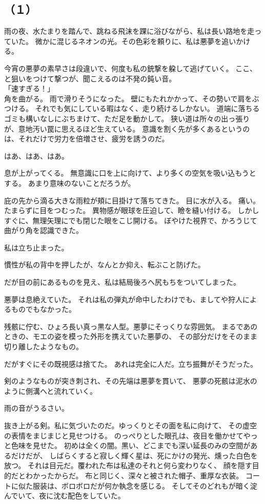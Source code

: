 \documentclass[../IHMain]{subfiles}
\begin{document}
\subsection*{（１）}
雨の夜、水たまりを踏んで、跳ねる飛沫を踝に浴びながら、私は長い路地を走っていた。
微かに混じるネオンの光。その色彩を頼りに、私は悪夢を追いかける。

今宵の悪夢の素早さは段違いで、何度も私の銃撃を躱して逃げていく。
ここ、と狙いをつけて撃つが、聞こえるのは不発の鈍い音。\\
「速すぎる！」\\
角を曲がる。
雨で滑りそうになった。
壁にもたれかかって、その勢いで肩をぶつける。
それでも気にしている暇はなく、走り続けるしかない。
道端に落ちるゴミも構いなしにぶちまけて、ただ足を動かして。
狭い道は所々の出っ張りが、意地汚い罠に思えるほど生えている。
意識を割く先が多くあるというのは、それだけで労力を倍増させ、疲労を誘うのだ。

はあ、はあ、はあ。

息が上がってくる。
無意識に口を上に向けて、より多くの空気を吸い込もうとする。
あまり意味のないことだろうが。

庇の先から滴る大きな雨粒が頬に目掛けて落ちてきた。
目に水が入る。
痛い。
たまらずに目をつむった。
異物感が眼球を圧迫して、瞼を縫い付ける。
しかしすぐに、無理矢理にでも閉じた眼をこじ開ける。
ぼやけた視界で、かろうじて曲がり角を認識できた。

私は立ち止まった。

慣性が私の背中を押したが、なんとか抑え、転ぶこと防げた。

だが目の前にあるものを見え、私は結局後ろへ尻もちをついてしまった。

悪夢は息絶えていた。
それは私の弾丸が命中したわけでも、ましてや狩人によるものでもなかった。

残骸に佇む、ひょろ長い真っ黒な人型。悪夢にそっくりな雰囲気。
まるであのときの、モエの姿を模った外形を携えていた悪夢の、
その部分だけをそのまま切り離したようなもの。

だがすぐにその既視感は捨てた。
あれは完全に人だ。立ち振舞がそうだった。

剣のようなものが突き刺され、その先端は悪夢を貫いて、
悪夢の死骸は泥水のように側溝へと流れていく。

雨の音がうるさい。

抜き上がる剣。私に気づいたのだ。ゆっくりとその面を私に向けて、
その虚空の表情をまじまじと見せつける。
のっぺりとした眼孔は、夜目を働かせてやっと色味を見せた。
初めは全くの闇。黒い、どこまでも深い延長のみの空間があるだけだが、
しばらくすると寂しく輝く星は、死にかけの発光、燻った白色を放つ。
それは目元だ。覆われた布は私達のそれと何ら変わりなく、
顔を隠す目的だとわかったからだ。
布と同じく、深々と被された帽子、重厚な衣装。
コートに似た服装は、ボロボロだが何か執念を感じる。
そしてそのどれもが暗く淀んでいて、夜に沈む配色をしていた。
\end{document}
